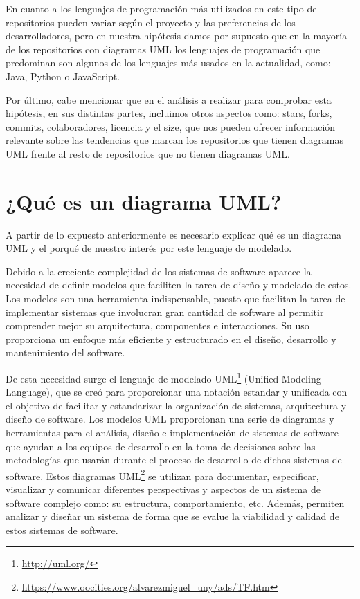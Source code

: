 \documentclass[a4paper, 12pt]{book}
\begin{document}
En cuanto a los lenguajes de programación más utilizados en este tipo de repositorios pueden variar según el proyecto y las preferencias de los desarrolladores, pero en nuestra hipótesis damos por supuesto que en la mayoría de los repositorios con diagramas UML los lenguajes de programación que predominan son algunos de los lenguajes más usados en la actualidad, como: Java, Python o JavaScript. 


Por último, cabe mencionar que en el análisis a realizar para comprobar esta hipótesis, en sus distintas partes, incluimos otros aspectos como: stars, forks, commits, colaboradores, licencia y el size, que nos pueden ofrecer información relevante sobre las tendencias que marcan los repositorios que tienen diagramas UML frente al resto de repositorios que no tienen diagramas UML.


\section{¿Qué es un diagrama UML?} %
\label{sec:qué es un UML} %

A partir de lo expuesto anteriormente es necesario explicar qué es un diagrama UML y el porqué de nuestro interés por este lenguaje de modelado.


Debido a la creciente complejidad de los sistemas de software aparece la necesidad de definir modelos que faciliten la tarea de diseño y modelado de estos. 
Los modelos son una herramienta indispensable, puesto que facilitan la tarea de implementar sistemas que involucran gran cantidad de software al permitir comprender mejor su arquitectura, componentes e interacciones.
Su uso proporciona un enfoque más eficiente y estructurado en el diseño, desarrollo y mantenimiento del software.


De esta necesidad surge el lenguaje de modelado UML\footnote{\url{http://uml.org/}} (Unified Modeling Language), que se creó para proporcionar una notación estandar y unificada con el objetivo de facilitar y estandarizar la organización de sistemas, arquitectura y diseño de software.
Los modelos UML proporcionan una serie de diagramas y herramientas para el análisis, diseño e implementación de sistemas de software que ayudan a los equipos de desarrollo en la toma de decisiones sobre las metodologías que usarán durante el proceso de desarrollo de dichos sistemas de software. 
Estos diagramas UML\footnote{\url{https://www.oocities.org/alvarezmiguel_uny/ads/TF.htm}} se utilizan para documentar, especificar, visualizar y comunicar diferentes perspectivas y aspectos de un sistema de software complejo como: su estructura, comportamiento, etc.
Además, permiten analizar y diseñar un sistema de forma que se evalue la viabilidad y calidad de estos sistemas de software.
\end{document}
